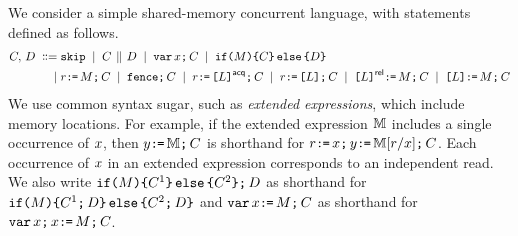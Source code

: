\begin{comment}
\footnote{We only consider executions where register state is empty in
  forked threads.  Given item~\ref{pre-acquire} of
  Definition~\ref{def:prefix}, a sufficient condition is that parallel
  composition is always preceded by an acquire fence, as in programs of the
  form:
  \begin{displaymath}
    \VAR\vec{\aLoc}\SEMI
    \vec{\aLoc}\GETS\vec{0}\SEMI
    \vec{\bLoc}\GETS\vec{0}\SEMI
    \FENCE\SEMI
    (\aCmd^1 \PAR \cdots \PAR \aCmd^n)
  \end{displaymath}
  where $\aCmd^1$, \ldots, $\aCmd^n$ do not include $\PAR$.  To avoid clutter
  in drawings, we often drop the explicit fence.}.
\end{comment}


We consider a simple shared-memory concurrent language, with statements
defined as follows.
\begin{align*}
C,\,D
\;\mathrel{\mathord{\vcentcolon}\mkern-1mu\mathord{\vcentcolon}\mathord{{=}}}\;& \texttt{skip}
\;\mathrel{|}\; C \,\mathbin{\|}\, D
\;\mathrel{|}\; \texttt{var}\,x\texttt{;}\, C
\;\mathrel{|}\; \texttt{if}\allowbreak\texttt{(}M\texttt{)} \allowbreak\texttt{\{} C \texttt{\}}\,\allowbreak\texttt{else}\allowbreak\,\texttt{\{} D \texttt{\}}
\\
\;\mathrel{|}\;& r\texttt{:}\mkern-1mu\texttt{=}\,M\texttt{;}\, C
\;\mathrel{|}\; \texttt{fence}\texttt{;}\, C
\;\mathrel{|}\; r\texttt{:}\mkern-1mu\texttt{=}\,\texttt{[}L\texttt{]}^{\mathsf{acq}}\texttt{;}\, C 
\;\mathrel{|}\; r\texttt{:}\mkern-1mu\texttt{=}\,\texttt{[}L\texttt{]}\texttt{;}\, C
\;\mathrel{|}\; \texttt{[}L\texttt{]}^{\mathsf{rel}}\texttt{:}\mkern-1mu\texttt{=}\,M\texttt{;}\, C
\;\mathrel{|}\; \texttt{[}L\texttt{]}\texttt{:}\mkern-1mu\texttt{=}\,M\texttt{;}\, C
\end{align*}
We use common syntax sugar, such as \emph{extended expressions}, which include
memory locations.  For example, if the extended expression $\mathbb{M}$ includes
a single occurrence of $x$, then $y\texttt{:}\mkern-1mu\texttt{=}\,\mathbb{M}\texttt{;}\, C$ is
shorthand for $r\texttt{:}\mkern-1mu\texttt{=}\,x\texttt{;}\,y\texttt{:}\mkern-1mu\texttt{=}\,\mathbb{M}[r/x]\texttt{;}\, C$.
Each occurrence of $x$ in an extended expression corresponds to an
independent read.  We also write
$\texttt{if}\allowbreak\texttt{(}M\texttt{)} \allowbreak\texttt{\{} C^1 \texttt{\}}\,\allowbreak\texttt{else}\allowbreak\,\texttt{\{} C^2 \texttt{\}} \texttt{;}\, D$ as shorthand for
$\texttt{if}\allowbreak\texttt{(}M\texttt{)} \allowbreak\texttt{\{} C^1 \texttt{;}\, D\texttt{\}}\,\allowbreak\texttt{else}\allowbreak\,\texttt{\{} C^2 \texttt{;}\, D\texttt{\}}$ and
$\texttt{var}\,x\texttt{:}\mkern-1mu\texttt{=}\,M\texttt{;}\, C$ as shorthand for
$\texttt{var}\,x\texttt{;}\,x\texttt{:}\mkern-1mu\texttt{=}\,M\texttt{;}\, C$.


